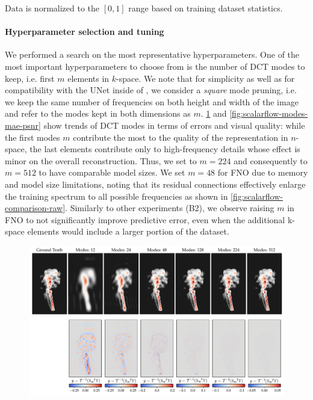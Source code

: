Data is normalized to the $[0,1]$ range based on training dataset statistics.
%

\paragraph{Hyperparameter selection and tuning}
We performed a search on the most representative hyperparameters. One of the most important hyperparameters to choose from is the number of DCT modes to keep, i.e. first $m$ elements in $k$-space. We note that for simplicity as well as for compatibility with the UNet inside of \ourmethod{+}, we consider a  \textit{square} mode pruning, i.e. we keep the same number of frequencies on both height and width of the image and refer to the modes kept in both dimensions as $m$. \cref{fig:scalarflow-modes-visualization} and \cref{fig:scalarflow-modes-mae-psnr} show trends of DCT modes in terms of errors and visual quality: while the first modes $m$ contribute the most to the quality of the representation in $n$-space, the last elements contribute only to high-frequency details whose effect is minor on the overall reconstruction. Thus, we set \ourmethod{+} to $m=224$ and consequently \ourmethod{} to $m=512$ to have comparable model sizes. We set $m=48$ for FNO due to memory and model size limitations, noting that its residual connections effectively enlarge the training spectrum to all possible frequencies as shown in \cref{fig:scalarflow-comparison-raw}. Similarly to other experiments (B2), we observe raising $m$ in FNO to not significantly improve predictive error, even when the additional k-space elements would include a larger portion of the dataset.

\begin{figure}[h!]
    \centering
    \includegraphics[width=0.95\linewidth]{figures/scalarflow_modes_error_t.pdf}
\label{fig:scalarflow-modes-visualization}
\end{figure}

